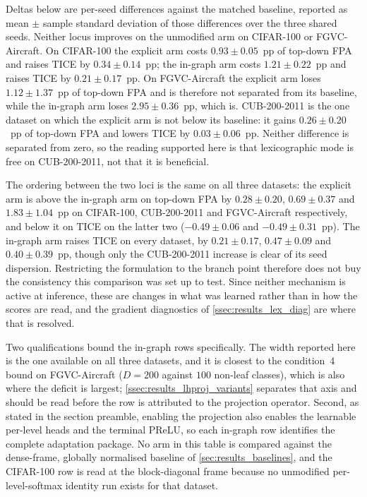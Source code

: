 Deltas below are per-seed differences against the matched baseline, reported as
mean $\pm$ sample standard deviation of those differences over the three shared
seeds. Neither locus improves on the unmodified arm on CIFAR-100 or
FGVC-Aircraft. On CIFAR-100 the explicit arm costs $0.93\pm0.05$~pp of top-down
FPA and raises TICE by $0.34\pm0.14$~pp; the in-graph arm costs
$1.21\pm0.22$~pp and raises TICE by $0.21\pm0.17$~pp. On FGVC-Aircraft the
explicit arm loses $1.12\pm1.37$~pp of top-down FPA and is therefore not
separated from its baseline, while the in-graph arm loses $2.95\pm0.36$~pp,
which is. CUB-200-2011 is the one dataset on which the explicit arm is not
below its baseline: it gains $0.26\pm0.20$~pp of top-down FPA and lowers TICE by
$0.03\pm0.06$~pp. Neither difference is separated from zero, so the reading
supported here is that lexicographic mode is free on CUB-200-2011, not that it
is beneficial.

The ordering between the two loci is the same on all three datasets: the
explicit arm is above the in-graph arm on top-down FPA by $0.28\pm0.20$,
$0.69\pm0.37$ and $1.83\pm1.04$~pp on CIFAR-100, CUB-200-2011 and
FGVC-Aircraft respectively, and below it on TICE on the latter two
($-0.49\pm0.06$ and $-0.49\pm0.31$~pp). The in-graph arm raises TICE on every
dataset, by $0.21\pm0.17$, $0.47\pm0.09$ and $0.40\pm0.39$~pp, though only the
CUB-200-2011 increase is clear of its seed dispersion. Restricting the
formulation to the branch point therefore does not buy the consistency this
comparison was set up to test. Since neither mechanism is active at inference,
these are changes in what was learned rather than in how the scores are read,
and the gradient diagnostics of \cref{ssec:results_lex_diag} are where that is
resolved.

Two qualifications bound the in-graph rows specifically. The width reported here
is the one available on all three datasets, and it is closest to the
condition~4 bound on FGVC-Aircraft ($D=200$ against $100$ non-leaf classes),
which is also where the deficit is largest; \cref{ssec:results_lhproj_variants}
separates that axis and should be read before the row is attributed to the
projection operator. Second, as stated in the section preamble, enabling the
projection also enables the learnable per-level heads and the terminal PReLU, so
each in-graph row identifies the complete adaptation package. No arm in this
table is compared against the dense-frame, globally normalised baseline of
\cref{sec:results_baselines}, and the CIFAR-100 row is read at the
block-diagonal frame because no unmodified per-level-softmax identity run exists
for that dataset.

